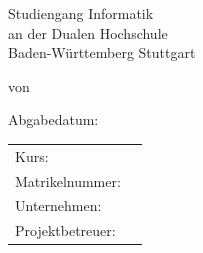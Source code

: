 \documentclass[12pt]{report}
\begin{document}
 
	
	\begin{titlepage}
		\thispagestyle{titlepage}
		\newcommand\HRule{\rule{\textwidth}{1pt}} %
		
		
		\begin{center}
			
			\vspace*{2cm}
			
			\begin{spacing}{2}
				{ \huge \bfseries \MakeUppercase{\meinTitel}}
			\end{spacing}
			
			\vspace*{1.5cm}
			
			\Large \artDerArbeit
			
			\vspace*{2cm}
			
			{\LARGE Studiengang Informatik}\\
			{\LARGE an der Dualen Hochschule}\\
			{\LARGE Baden-Württemberg Stuttgart}\\
			
			\vspace*{2cm}
			
			\Large von \meinName
			
			\vspace*{1.5cm}
			
			\Large Abgabedatum: \abgabeDatum
			
			\begin{table}[bp]
				\centering
				\begin{tabular}{l l}
					Kurs: & \meinKurs  \\
					Matrikelnummer: & \meineMatrikelNr  \\
					Unternehmen: & \firmenName \\
					Projektbetreuer: &  \projektBetreuer\\
				\end{tabular}
			\end{table}
			
			
		\end{center}
		
	\end{titlepage}


\fancypagestyle{plain}{
	\fancyfoot[L]{\meinName\\
		 \meinKurs}
	\fancyfoot[C]{Seite \thepage\ }%
	\fancyfoot[R]{\abgabeDatum}
}
\end{document}
